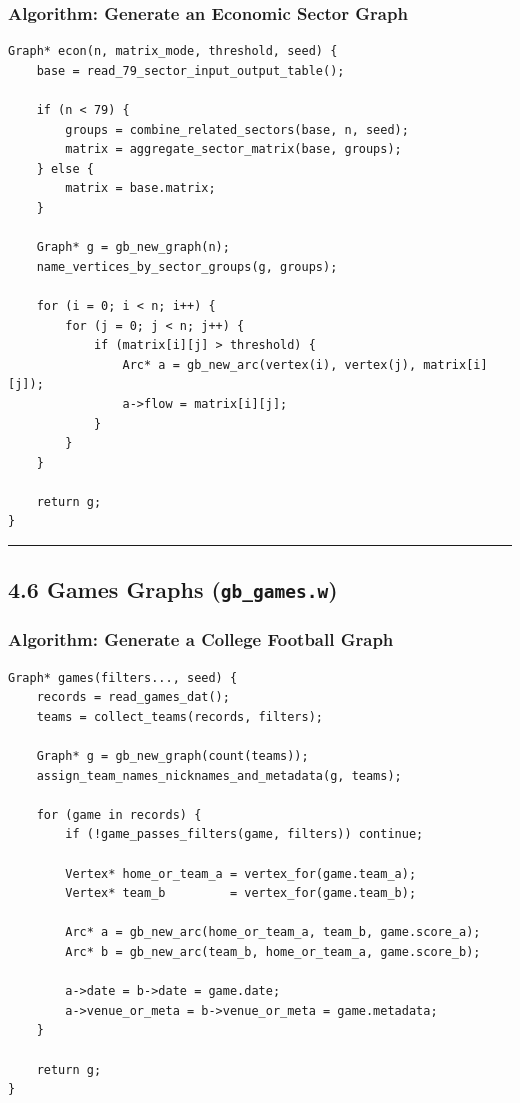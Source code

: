\documentclass[11pt]{article}
\begin{document}
\subsubsection{Algorithm: Generate an Economic Sector Graph}\label{algorithm-generate-an-economic-sector-graph}

\begin{verbatim}
Graph* econ(n, matrix_mode, threshold, seed) {
    base = read_79_sector_input_output_table();

    if (n < 79) {
        groups = combine_related_sectors(base, n, seed);
        matrix = aggregate_sector_matrix(base, groups);
    } else {
        matrix = base.matrix;
    }

    Graph* g = gb_new_graph(n);
    name_vertices_by_sector_groups(g, groups);

    for (i = 0; i < n; i++) {
        for (j = 0; j < n; j++) {
            if (matrix[i][j] > threshold) {
                Arc* a = gb_new_arc(vertex(i), vertex(j), matrix[i][j]);
                a->flow = matrix[i][j];
            }
        }
    }

    return g;
}
\end{verbatim}

\begin{center}\rule{0.5\linewidth}{0.5pt}\end{center}

\subsection{\texorpdfstring{4.6 Games Graphs (\texttt{gb\_games.w})}{4.6 Games Graphs (gb\_games.w)}}\label{games-graphs-gb_games.w}

\subsubsection{Algorithm: Generate a College Football Graph}\label{algorithm-generate-a-college-football-graph}

\begin{verbatim}
Graph* games(filters..., seed) {
    records = read_games_dat();
    teams = collect_teams(records, filters);

    Graph* g = gb_new_graph(count(teams));
    assign_team_names_nicknames_and_metadata(g, teams);

    for (game in records) {
        if (!game_passes_filters(game, filters)) continue;

        Vertex* home_or_team_a = vertex_for(game.team_a);
        Vertex* team_b         = vertex_for(game.team_b);

        Arc* a = gb_new_arc(home_or_team_a, team_b, game.score_a);
        Arc* b = gb_new_arc(team_b, home_or_team_a, game.score_b);

        a->date = b->date = game.date;
        a->venue_or_meta = b->venue_or_meta = game.metadata;
    }

    return g;
}
\end{verbatim}
\end{document}
